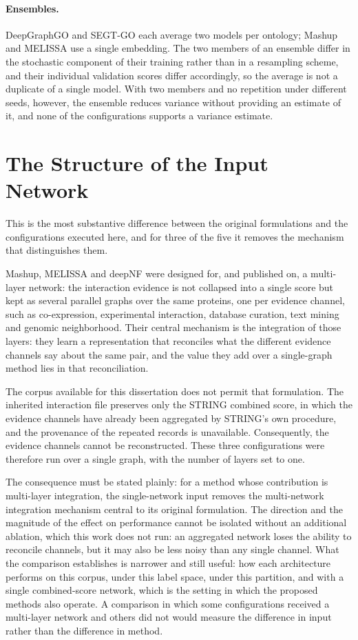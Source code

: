 \documentclass[Ingles]{ic-tese-v3}
\begin{document}
\begin{appendices}{}
\paragraph{Ensembles.} DeepGraphGO and SEGT-GO each average two models per ontology; Mashup and
MELISSA use a single embedding. The two members of an ensemble differ in the stochastic component of
their training rather than in a resampling scheme, and their individual validation scores differ
accordingly, so the average is not a duplicate of a single model. With two members and no repetition
under different seeds, however, the ensemble reduces variance without providing an estimate of it,
and none of the configurations supports a variance estimate.

\section{The Structure of the Input Network}
\label{ape:multigrafo}

This is the most substantive difference between the original formulations and the configurations
executed here, and for three of the five it removes the mechanism that distinguishes them.

Mashup, MELISSA and deepNF were designed for, and published on, a multi-layer network: the
interaction evidence is not collapsed into a single score but kept as several parallel graphs over
the same proteins, one per evidence channel, such as co-expression, experimental interaction,
database curation, text mining and genomic neighborhood. Their central mechanism is the integration
of those layers: they learn a representation that reconciles what the different evidence channels say
about the same pair, and the value they add over a single-graph method lies in that reconciliation.

The corpus available for this dissertation does not permit that formulation. The inherited
interaction file preserves only the STRING combined score, in which the evidence channels have
already been aggregated by STRING's own procedure, and the provenance of the repeated records is
unavailable. Consequently, the evidence channels cannot be reconstructed. These three configurations were therefore run
over a single graph, with the number of layers set to one.

The consequence must be stated plainly: for a method whose contribution is multi-layer integration,
the single-network input removes the multi-network integration mechanism central to its original
formulation. The direction and the magnitude of the effect on performance cannot be isolated without
an additional ablation, which this work does not run: an aggregated network loses the ability to
reconcile channels, but it may also be less noisy than any single channel. What the comparison
establishes is narrower and still useful: how each architecture performs on this corpus, under this
label space, under this partition, and with a single combined-score network, which is the setting in
which the proposed methods also operate. A comparison in which some configurations received a
multi-layer network and others did not would measure the difference in input rather than the
difference in method.


\end{appendices}
\end{document}
